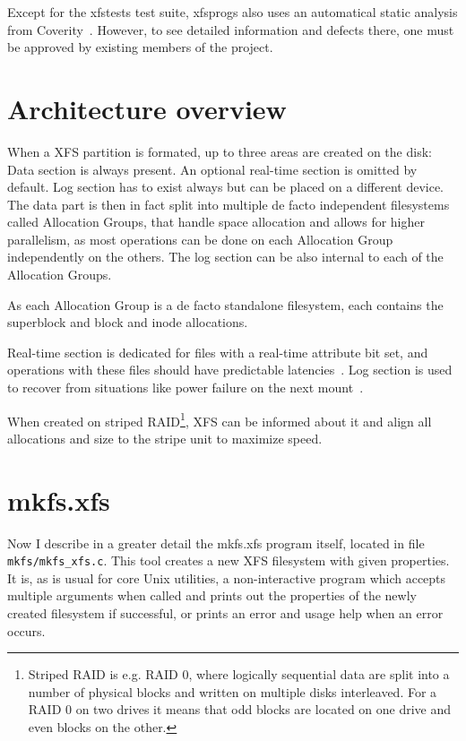 Except for the xfstests test suite, xfsprogs also uses an automatical static analysis from Coverity~\cite{CoverityXfsprogs}. However, to see detailed information and defects there, one must be approved by existing members of the project.


\section{Architecture overview}\label{chap:xfs:overview}

When a XFS partition is formated, up to three areas are created on the disk: Data section is always present. An optional real-time section is omitted by default. Log section has to exist always but can be placed on a different device. The data part is then in fact split into multiple de facto independent filesystems called Allocation Groups, that handle space allocation and allows for higher parallelism, as most operations can be done on each Allocation Group independently on the others. The log section can be also internal to each of the Allocation Groups.

As each Allocation Group is a de facto standalone filesystem, each contains the superblock and block and inode allocations.

Real-time section is dedicated for files with a real-time attribute bit set, and operations with these files should have predictable latencies~\cite{xfsRealtime}. Log section is used to recover from situations like power failure on the next mount~\cite{xfsStructure,xfsman}.

When created on striped RAID\footnote{Striped RAID is e.g. RAID 0, where logically sequential data are split into a number of physical blocks and written on multiple disks interleaved. For a RAID 0 on two drives it means that odd blocks are located on one drive and even blocks on the other.}, XFS can be informed about it and align all allocations and size to the stripe unit to maximize speed.

\section{mkfs.xfs}\label{chap:xfs:mkfs}
Now I describe in a greater detail the mkfs.xfs program itself, located in file {\tt mkfs/mkfs\_xfs.c}. This tool creates a new XFS filesystem with given properties. It is, as is usual for core Unix utilities, a non-interactive program which accepts multiple arguments when called and prints out the properties of the newly created filesystem if successful, or prints an error and usage help when an error occurs.

